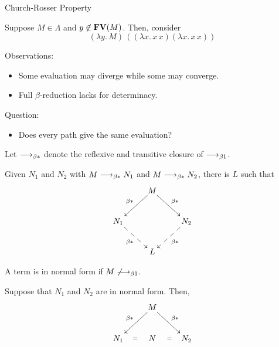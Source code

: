 \begin{frame}[allowframebreaks]{Church-Rosser Property}
  \begin{example}
    Suppose $M \in \Lambda$ and $y \not\in \mathbf{FV}(M)$. 
    Then, consider 
    \[
      (\lambda y.\, M)\, ((\lambda x.\, x\,x)(\lambda x.\, x\, x))
    \]
  \end{example}
  Observations:
  \begin{itemize}
    \item Some evaluation may diverge while some may converge.
    \item Full $\beta$-reduction lacks for determinacy. 
  \end{itemize}
  Question:
  \begin{itemize}
    \item Does every path give the same evaluation?
  \end{itemize}

  \framebreak

  Let $\longrightarrow_{\beta*}$ denote the reflexive and transitive closure of $\longrightarrow_{\beta1}$.
\begin{theorem}
  Given $N_1$ and $N_2$ with $M \longrightarrow_{\beta*} N_1$ and $M\longrightarrow_{\beta*} N_2$, there is $L$
  such that
  \[
    \xymatrix{
      & M \ar[rd]^{\beta*} \ar[ld]_{\beta*} \\
      N_1 \ar@{-->}[rd]_{\beta*} & & N_2 \ar@{-->}[ld]^{\beta*} \\
      & L
    }
  \]
\end{theorem}
\framebreak
A term is in normal form if $M \not\longrightarrow_{\beta1}$. 

\begin{corollary}\label{coro:uniqueness-normal}
  Suppose that $N_1$ and $N_2$ are in normal form. Then, 
  \[
    \xymatrix{
      & M \ar[rd]^{\beta*} \ar[ld]_{\beta*} \\
      N_1 \ar@{}[r]|{=} & N & N_2 \ar@{}[l]|{=} \\
    }
  \]
\end{corollary}


\end{frame}
